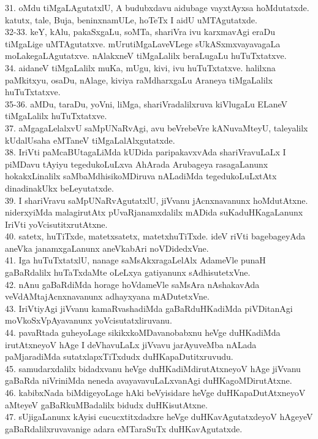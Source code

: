 \documentclass{article}
\begin{document}
31. oMdu tiMgaLAgutatxlU, A budubxdavu aidubage vayxtAyxsa hoMdutatxde. katutx, tale, Buja, beninxnamULe, hoTeTx I aidU uMTAgutatxde.\\
32-33. keY, kAlu, pakaSxgaLu, soMTa, shariVra ivu karxmavAgi eraDu tiMgaLige uMTAgutatxve. mUrutiMgaLaveVLege sUkASxmxvayavagaLa moLakegaLAgutatxve. nAlakxneV tiMgaLalilx beraLugaLu huTuTxtatxve.\\
34. aidaneV tiMgaLalilx muKa, mUgu, kivi, ivu huTuTxtatxve. halilxna paMkitxyu, osaDu, nAlage, kiviya raMdharxgaLu Araneya tiMgaLalilx huTuTxtatxve.\\
35-36. aMDu, taraDu, yoVni, liMga, shariVradalilxruva kiVlugaLu ELaneV tiMgaLalilx huTuTxtatxve.\\
37. aMgagaLelalxvU saMpUNaRvAgi, avu beVrebeVre kANuvaMteyU, taleyalilx kUdalUsaha eMTaneV tiMgaLalAlxgutatxde.\\
38. IriVti paMcaBUtagaLiMda kUDida paripakavxvAda shariVravuLaLx I piMDavu tAyiyu tegedukoLuLxva AhArada Arubageya rasagaLanunx hokakxLinalilx saMbaMdhisikoMDiruva nALadiMda tegedukoLuLxtAtx dinadinakUkx beLeyutatxde.\\
39. I shariVravu saMpUNaRvAgutatxlU, jiVvanu jAcnxnavanunx hoMdutAtxne. niderxyiMda malagirutAtx pUvaRjanamxdalilx mADida suKaduHKagaLanunx IriVti yoVcisutitxrutAtxne.\\
40. satetx, huTiTxde, matetxsatetx, matetxhuTiTxde. ideV riVti bagebageyAda aneVka janamxgaLanunx aneVkabAri noVDidedxVne.\\
41. Iga huTuTxtatxlU, nanage saMsAkxragaLelAlx AdameVle punaH gaBaRdalilx huTaTxdaMte oLeLxya gatiyanunx sAdhisutetxVne.\\
42. nAnu gaBaRdiMda horage hoVdameVle saMsAra nAshakavAda veVdAMtajAcnxnavanunx adhayxyana mADutetxVne.\\
43. IriVtiyAgi jiVvanu kamaRvashadiMda gaBaRduHKadiMda piVDitanAgi moVkoSxVpAyavanunx yoVcisutatxliruvanu.\\
44. pavaRtada guheyoLage sikikxkoMDavanobabxnu heVge duHKadiMda irutAtxneyoV hAge I deVhavuLaLx jiVvavu jarAyuveMba nALada paMjaradiMda sutatxlapxTiTxdudx duHKapaDutitxruvudu.\\
45. samudarxdalilx bidadxvanu heVge duHKadiMdirutAtxneyoV hAge jiVvanu gaBaRda niVriniMda neneda avayavavuLaLxvanAgi duHKagoMDirutAtxne.\\
46. kabibxNada biMdigeyoLage hAki beVyisidare heVge duHKapaDutAtxneyoV aMteyeV gaBaRkuMBadalilx bidudx duHKisutAtxne.\\
47. sUjigaLanunx kAyisi cucucxtitxdadxre heVge duHKavAgutatxdeyoV hAgeyeV gaBaRdalilxruvavanige adara eMTaraSuTx duHKavAgutatxde.\\
\end{document}
